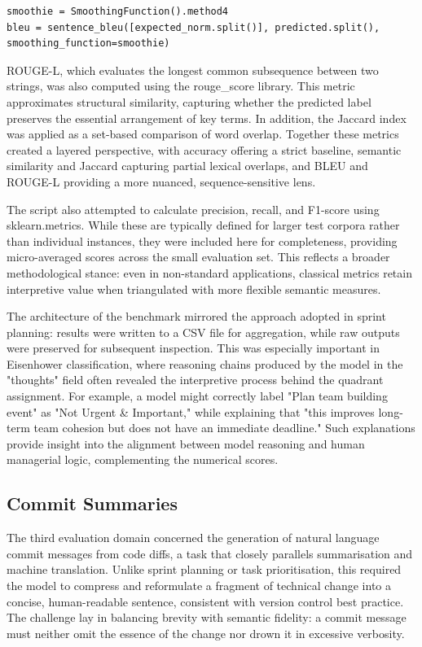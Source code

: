 \documentclass{report}
\begin{document}
\begin{lstlisting}[style=pythonstyle]
smoothie = SmoothingFunction().method4
bleu = sentence_bleu([expected_norm.split()], predicted.split(), smoothing_function=smoothie)

\end{lstlisting}

ROUGE-L, which evaluates the longest common subsequence between two strings, was also computed using the rouge\_score library. 
This metric approximates structural similarity, capturing whether the predicted label preserves the essential arrangement of key terms. 
In addition, the Jaccard index was applied as a set-based comparison of word overlap. 
Together these metrics created a layered perspective, with accuracy offering a strict baseline, semantic similarity and Jaccard capturing partial lexical overlaps, and BLEU and ROUGE-L providing a more nuanced, sequence-sensitive lens.

The script also attempted to calculate precision, recall, and F1-score using sklearn.metrics. 
While these are typically defined for larger test corpora rather than individual instances, they were included here for completeness, providing micro-averaged scores across the small evaluation set. 
This reflects a broader methodological stance: even in non-standard applications, classical metrics retain interpretive value when triangulated with more flexible semantic measures.

The architecture of the benchmark mirrored the approach adopted in sprint planning: results were written to a CSV file for aggregation, while raw outputs were preserved for subsequent inspection. 
This was especially important in Eisenhower classification, where reasoning chains produced by the model in the "thoughts" field often revealed the interpretive process behind the quadrant assignment. 
For example, a model might correctly label "Plan team building event" as "Not Urgent \& Important," while explaining that "this improves long-term team cohesion but does not have an immediate deadline." 
Such explanations provide insight into the alignment between model reasoning and human managerial logic, complementing the numerical scores.

\subsection{Commit Summaries}

The third evaluation domain concerned the generation of natural language commit messages from code diffs, a task that closely parallels summarisation and machine translation. 
Unlike sprint planning or task prioritisation, this required the model to compress and reformulate a fragment of technical change into a concise, human-readable sentence, consistent with version control best practice. 
The challenge lay in balancing brevity with semantic fidelity: a commit message must neither omit the essence of the change nor drown it in excessive verbosity.
\end{document}
